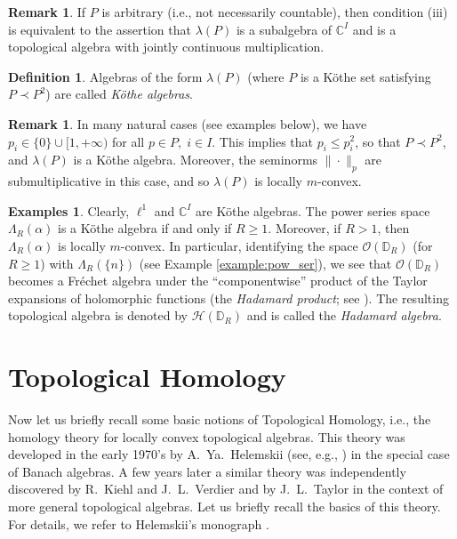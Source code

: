 \documentclass[12pt,reqno]{amsart}
\theoremstyle{definition}
\newtheorem{definition}[theorem]{Definition}
\newtheorem{examples}[theorem]{Examples}
\newtheorem{remark}[theorem]{Remark}
\begin{document}
\begin{remark}
If $P$ is arbitrary (i.e., not necessarily countable), then condition (iii)
is equivalent to the assertion that $\lambda(P)$
is a subalgebra of ${\mathbb C}^I$ and is a topological algebra with jointly continuous
multiplication.
\end{remark}

\begin{definition}
Algebras of the form $\lambda(P)$ (where $P$ is a K\"othe set
satisfying $P\prec P^2$) are called {\em K\"othe algebras}.
\end{definition}

\begin{remark}
In many natural cases (see examples below), we have $p_i\in\{ 0\}\cup [1,+\infty)$ for
all $p\in P,\; i\in I$. This implies that $p_i\le p_i^2$, so that $P\prec P^2$,
and $\lambda(P)$ is a K\"othe algebra. Moreover, the seminorms $\|\cdot\|_p$
are submultiplicative in this case, and so $\lambda(P)$ is locally $m$-convex.
\end{remark}

\begin{examples}
Clearly, $\ell^1$ and ${\mathbb C}^I$ are K\"othe algebras.
The power series space $\Lambda_R(\alpha)$ is a K\"othe algebra if and only
if $R\ge 1$. Moreover, if $R>1$, then $\Lambda_R(\alpha)$ is locally $m$-convex.
In particular, identifying the space ${\mathscr O}({\mathbb D}_R)$ (for $R\ge 1$)
with $\Lambda_R(\{ n\})$ (see Example \ref{example:pow_ser}), we see that
${\mathscr O}({\mathbb D}_R)$ becomes a Fr\'echet algebra under the
``componentwise'' product of the Taylor expansions
of holomorphic functions (the {\em Hadamard product}; see \cite{Render}).
The resulting topological algebra is denoted by ${\mathscr H}(\mathbb D_R)$
and is called the {\em Hadamard algebra}.
\end{examples}

\section{Topological Homology}
Now let us briefly recall some basic notions of Topological Homology, i.e.,
the homology theory for locally convex topological algebras. This theory was developed
in the early 1970's by A.~Ya.~Helemskii (see, e.g., \cite{X_dg}) in the special case
of Banach algebras.
A few years later a similar theory was independently discovered
by R.~Kiehl and J.~L.~Verdier \cite{KV} and by J.~L.~Taylor \cite{T1}
in the context of more general topological algebras.
Let us briefly recall the basics of this theory.
For details, we refer to Helemskii's monograph \cite{X1}.
\end{document}
